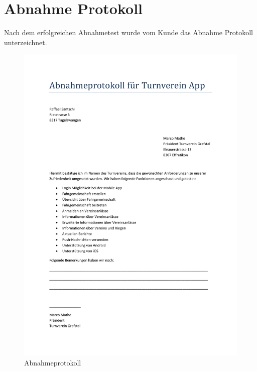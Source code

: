 \section{Abnahme Protokoll}
Nach dem erfolgreichen Abnahmetest wurde vom Kunde das Abnahme Protokoll unterzeichnet.
\begin{figure}[h]
\centering
\includegraphics[scale=0.55]{images/word/Abnahmeprotokoll.pdf}
\caption{Abnahmeprotokoll}
\label{fig:abnahmeprotokoll}
\end{figure}
